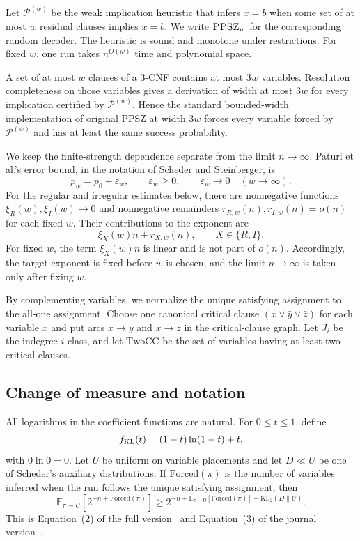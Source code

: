 \documentclass[11pt]{article}
\newcommand{\PPSZ}{\textnormal{\textsc{PPSZ}}}
\newcommand{\Pw}{\mathcal P^{(w)}}
\newcommand{\TwoCC}{\mathrm{TwoCC}}
\newcommand{\eps}{\varepsilon}
\newcommand{\E}{\mathbb E}
\begin{document}
Let $\Pw$ be the weak implication heuristic that infers $x=b$ when some set of at most $w$ residual clauses implies $x=b$.  We write $\PPSZ_w$ for the corresponding random decoder.  The heuristic is sound and monotone under restrictions.  For fixed $w$, one run takes $n^{O(w)}$ time and polynomial space.

A set of at most $w$ clauses of a 3-CNF contains at most $3w$ variables.  Resolution completeness on those variables gives a derivation of width at most $3w$ for every implication certified by $\Pw$.  Hence the standard bounded-width implementation of original PPSZ at width $3w$ forces every variable forced by $\Pw$ and has at least the same success probability.

We keep the finite-strength dependence separate from the limit $n\to\infty$.  Paturi et al.'s error bound, in the notation of Scheder and Steinberger, is
\begin{equation}\label{eq:pw-error}
 p_w=p_0+\eps_w,
 \qquad
 \eps_w\ge0,
 \qquad
 \eps_w\longrightarrow0
 \quad(w\to\infty).
\end{equation}
For the regular and irregular estimates below, there are nonnegative functions $\xi_R(w),\xi_I(w)\to0$ and nonnegative remainders $r_{R,w}(n),r_{I,w}(n)=o(n)$ for each fixed $w$.  Their contributions to the exponent are
\[
 \xi_X(w)n+r_{X,w}(n),
 \qquad X\in\{R,I\}.
\]
For fixed $w$, the term $\xi_X(w)n$ is linear and is not part of $o(n)$.  Accordingly, the target exponent is fixed before $w$ is chosen, and the limit $n\to\infty$ is taken only after fixing $w$.

By complementing variables, we normalize the unique satisfying assignment to the all-one assignment.  Choose one canonical critical clause $(x\vee\bar y\vee\bar z)$ for each variable $x$ and put arcs $x\to y$ and $x\to z$ in the critical-clause graph.  Let $J_i$ be the indegree-$i$ class, and let $\TwoCC$ be the set of variables having at least two critical clauses.

\subsection{Change of measure and notation}

All logarithms in the coefficient functions are natural.  For $0\le t\le1$, define
\[
 f_{\rm KL}(t)=(1-t)\ln(1-t)+t,
\]
with $0\ln0=0$.  Let $U$ be uniform on variable placements and let $D\ll U$ be one of Scheder's auxiliary distributions.  If $\mathrm{Forced}(\pi)$ is the number of variables inferred when the run follows the unique satisfying assignment, then
\begin{equation}\label{eq:change}
 \E_{\pi\sim U}\!\left[2^{-n+\mathrm{Forced}(\pi)}\right]
 \ge
 2^{-n+\E_{\pi\sim D}[\mathrm{Forced}(\pi)]
      -\mathrm{KL}_2(D\|U)}.
\end{equation}
This is Equation~(2) of the full version~\cite{SchederFull} and Equation~(3) of the journal version~\cite{SchederJournal}.
\end{document}
